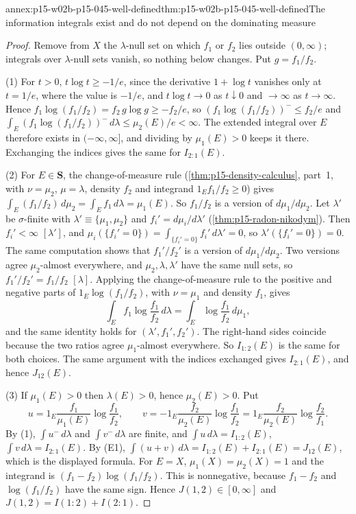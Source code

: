 \begin{annexitem}{annex:p15-w02b-p15-045-well-defined}{thm:p15-w02b-p15-045-well-defined}{The information integrals exist and do not depend on the dominating measure}
\begin{proof}
Remove from \(X\) the \(\lambda\)-null set on which \(f_1\) or \(f_2\)
lies outside \((0,\infty)\); integrals over \(\lambda\)-null sets vanish,
so nothing below changes. Put \(g=f_1/f_2\).

(1) For \(t>0\), \(t\log t\geq-1/e\), since the derivative \(1+\log t\)
vanishes only at \(t=1/e\), where the value is \(-1/e\), and
\(t\log t\to0\) as \(t\downarrow0\) and \(\to\infty\) as \(t\to\infty\).
Hence \(f_1\log(f_1/f_2)=f_2\,g\log g\geq-f_2/e\), so
\((f_1\log(f_1/f_2))^-\leq f_2/e\) and
\(\int_E(f_1\log(f_1/f_2))^-\,d\lambda\leq\mu_2(E)/e<\infty\). The
extended integral over \(E\) therefore exists in \((-\infty,\infty]\),
and dividing by \(\mu_1(E)>0\) keeps it there. Exchanging the indices
gives the same for \(I_{2:1}(E)\).

(2) For \(E\in\mathbf S\), the change-of-measure rule
(\cref{thm:p15-density-calculus}, part~1, with \(\nu=\mu_2\),
\(\mu=\lambda\), density \(f_2\) and integrand \(1_Ef_1/f_2\geq0\))
gives \(\int_E(f_1/f_2)\,d\mu_2=\int_Ef_1\,d\lambda=\mu_1(E)\). So
\(f_1/f_2\) is a version of \(d\mu_1/d\mu_2\). Let \(\lambda'\) be
\(\sigma\)-finite with \(\lambda'\equiv\{\mu_1,\mu_2\}\) and
\(f_i'=d\mu_i/d\lambda'\) (\cref{thm:p15-radon-nikodym}). Then
\(f_i'<\infty\) \([\lambda']\), and
\(\mu_i(\{f_i'=0\})=\int_{\{f_i'=0\}}f_i'\,d\lambda'=0\), so
\(\lambda'(\{f_i'=0\})=0\). The same computation shows that \(f_1'/f_2'\)
is a version of \(d\mu_1/d\mu_2\). Two versions agree \(\mu_2\)-almost
everywhere, and \(\mu_2,\lambda,\lambda'\) have the same null sets, so
\(f_1'/f_2'=f_1/f_2\) \([\lambda]\). Applying the change-of-measure rule
to the positive and negative parts of \(1_E\log(f_1/f_2)\), with
\(\nu=\mu_1\) and density \(f_1\), gives
\[
  \int_Ef_1\log\frac{f_1}{f_2}\,d\lambda=\int_E\log\frac{f_1}{f_2}\,d\mu_1,
\]
and the same identity holds for \((\lambda',f_1',f_2')\). The right-hand
sides coincide because the two ratios agree \(\mu_1\)-almost everywhere.
So \(I_{1:2}(E)\) is the same for both choices. The same argument with
the indices exchanged gives \(I_{2:1}(E)\), and hence \(J_{12}(E)\).

(3) If \(\mu_1(E)>0\) then \(\lambda(E)>0\), hence \(\mu_2(E)>0\). Put
\[
  u=1_E\frac{f_1}{\mu_1(E)}\log\frac{f_1}{f_2},\qquad
  v=-1_E\frac{f_2}{\mu_2(E)}\log\frac{f_1}{f_2}=1_E\frac{f_2}{\mu_2(E)}\log\frac{f_2}{f_1}.
\]
By (1), \(\int u^-\,d\lambda\) and \(\int v^-\,d\lambda\) are finite, and
\(\int u\,d\lambda=I_{1:2}(E)\), \(\int v\,d\lambda=I_{2:1}(E)\). By (E1),
\(\int(u+v)\,d\lambda=I_{1:2}(E)+I_{2:1}(E)=J_{12}(E)\), which is the
displayed formula. For \(E=X\), \(\mu_1(X)=\mu_2(X)=1\) and the
integrand is \((f_1-f_2)\log(f_1/f_2)\). This is nonnegative, because
\(f_1-f_2\) and \(\log(f_1/f_2)\) have the same sign. Hence
\(J(1,2)\in[0,\infty]\) and \(J(1,2)=I(1:2)+I(2:1)\).


\end{proof}
\end{annexitem}
